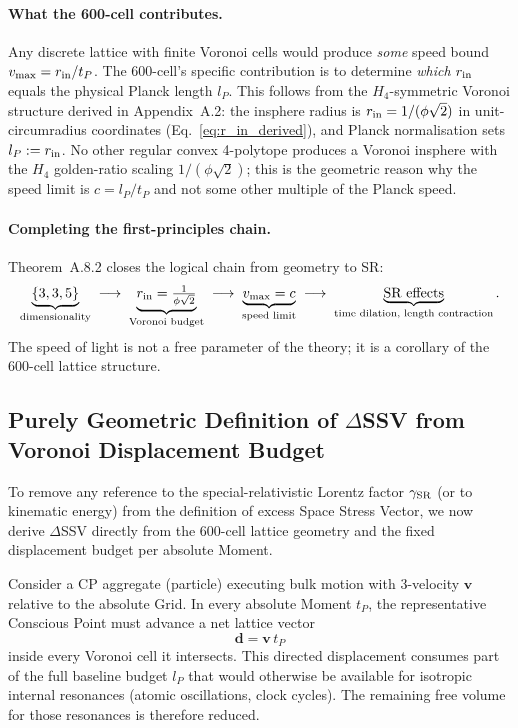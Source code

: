 \documentclass[11pt,letterpaper]{article}
\begin{document}
\paragraph{What the 600-cell contributes.}
Any discrete lattice with finite Voronoi cells would produce \emph{some}
speed bound $v_{\rm max} = r_{\rm in}/t_P$.
The 600-cell's specific contribution is to determine \emph{which} $r_{\rm in}$
equals the physical Planck length $l_P$.
This follows from the $H_4$-symmetric Voronoi structure derived in
Appendix~A.2: the insphere radius is $r_{\rm in} = 1/(\phi\sqrt{2})$ in
unit-circumradius coordinates (Eq.~\eqref{eq:r_in_derived}), and
Planck normalisation sets $l_P := r_{\rm in}$.
No other regular convex 4-polytope produces a Voronoi insphere with the
$H_4$ golden-ratio scaling $1/(\phi\sqrt{2})$; this is the geometric
reason why the speed limit is $c = l_P/t_P$ and not some other
multiple of the Planck speed.

\paragraph{Completing the first-principles chain.}
Theorem~A.8.2 closes the logical chain from geometry to SR:
\[
  \underbrace{\{3,3,5\}}_{\text{dimensionality}}
  \;\longrightarrow\;
  \underbrace{r_{\rm in} = \tfrac{1}{\phi\sqrt{2}}}_{\text{Voronoi budget}}
  \;\longrightarrow\;
  \underbrace{v_{\rm max} = c}_{\text{speed limit}}
  \;\longrightarrow\;
  \underbrace{\text{SR effects}}_{\text{time dilation, length contraction}}.
\]
The speed of light is not a free parameter of the theory; it is a
corollary of the 600-cell lattice structure.


\subsection{Purely Geometric Definition of \(\Delta\)SSV from Voronoi Displacement Budget}

To remove any reference to the special-relativistic Lorentz factor \(\gamma_{\rm SR}\) (or to kinematic energy) from the definition of excess Space Stress Vector, we now derive \(\Delta\)SSV directly from the 600-cell lattice geometry and the fixed displacement budget per absolute Moment.

Consider a CP aggregate (particle) executing bulk motion with 3-velocity \(\mathbf{v}\) relative to the absolute Grid. In every absolute Moment \(t_P\), the representative Conscious Point must advance a net lattice vector
\[
\mathbf{d} = \mathbf{v}\, t_P
\]
inside every Voronoi cell it intersects. This directed displacement consumes part of the full baseline budget \(l_P\) that would otherwise be available for isotropic internal resonances (atomic oscillations, clock cycles). The remaining free volume for those resonances is therefore reduced.
\end{document}
